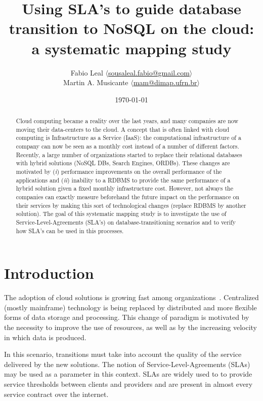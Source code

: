 \documentclass{article}
\begin{document}
\title{Using SLA's to guide database transition to NoSQL on the cloud: a systematic mapping study}
\author{Fabio Leal $\langle$\href{mailto:sousaleal.fabio@gmail.com}%
{sousaleal.fabio@gmail.com}$\rangle$
\\
Martin A. Musicante $\langle$\href{mailto:mam@dimap.ufrn.br}%
{mam@dimap.ufrn.br}$\rangle$}
\date{\today}
\maketitle  




\begin{abstract}
Cloud computing became a reality over the last years, and many companies are now moving their data-centers to the cloud. 
A concept that is often linked with cloud computing is Infrastructure as a Service (IaaS): the computational infrastructure of a company can now be seen as a monthly cost instead of a number of different factors. 
Recently, a large number of organizations started to replace their relational databases with hybrid solutions (NoSQL DBs, Search Engines, ORDBs). 
These changes are motivated by (\textit{i}) performance improvements on the overall performance of the applications and (\textit{ii}) inability to a RDBMS to provide the same performance of a hybrid solution given a fixed monthly infrastructure cost. 
However, not always the companies can exactly measure beforehand the future impact on the performance on their services by making this sort of technological changes (replace RDBMS by another solution). 
The goal of this systematic mapping study is to investigate the use of Service-Level-Agreements (SLA’s) on database-transitioning scenarios and to verify how SLA’s can be used in this processes.
\end{abstract}

\section{Introduction}

The adoption of cloud solutions is growing fast among organizations~\cite{6546068}.
Centralized (mostly mainframe) technology is being replaced by distributed and more flexible forms of data storage and processing.
This change of paradigm is motivated by the necessity to improve the use of resources, as well as by the increasing velocity in which data is produced.

In this scenario, transitions must take into account the quality of the service delivered by the new solutions.
The notion of Service-Level-Agreements (SLAs)~\cite{6253526} may be used as a parameter in this context. SLAs are widely used to to provide service thresholds between clients and providers and are present in almost every service contract over the internet. 
\end{document}
